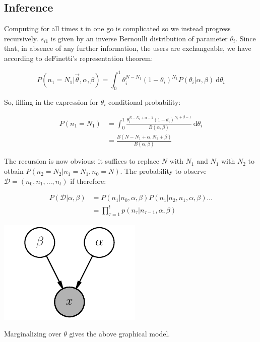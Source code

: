 \documentclass{tufte-book}
\begin{document}
    \subsection{Inference}%
    \label{sub:inference}

Computing for all times $t$ in one go is complicated so we instead progress recursively. $s_{i1}$ is given by an
inverse Bernoulli distribution of parameter $\theta_i$. Since that, in absence of any further information, the
users are exchangeable, we have according to deFinetti's representation theorem:

\begin{equation}
  P(n_1 = N_1 | \vec{\theta}, \alpha, \beta) = \int_0^1 \theta_i^{N-N_1} \left(1-\theta_i\right)^{N_1}
  P(\theta_i|\alpha, \beta)\: \mathrm{d}\theta_i
\end{equation}

So, filling in the expression for $\theta_i$ conditional probability:

\begin{align}
  P(n_1=N_1) &= \int_0^1 \frac{\theta_i^{N-N_1+\alpha-1}\left(1-\theta_i\right)^{N_1+\beta-1}}{B(\alpha,
  \beta)}\:\mathrm{d}\theta_i \nonumber\\
  &= \frac{B(N-N_1+\alpha, N_1+\beta)}{B(\alpha, \beta)}
\label{sbg:recursion-formula}
\end{align}

The recursion is now obvious: it suffices to replace $N$ with $N_1$ and $N_1$ with $N_2$ to otbain
$P(n_2=N_2|n_1=N_1, n_0=N)$. The probability to observe $
\mathcal{D} = \left(n_0, n_1, \dots, n_t\right)$ if therefore:

\begin{align*}
  P(\mathcal{D} | \alpha, \beta) &= P(n_1|n_0, \alpha, \beta) P(n_1|n_2, n_1, \alpha, \beta) \dots\\
      &= \prod_{\tau=1}^t p(n_\tau|n_{\tau-1}, \alpha, \beta)
\end{align*}

\begin{marginfigure}
  \centering
  \includegraphics[width=\linewidth]{./figures/shifted_beta_geometric_marginalized.pdf}
  \caption{Marginalizing over $\theta$ gives the above graphical model. \label{fig:sbg}}
\end{marginfigure}
\end{document}
